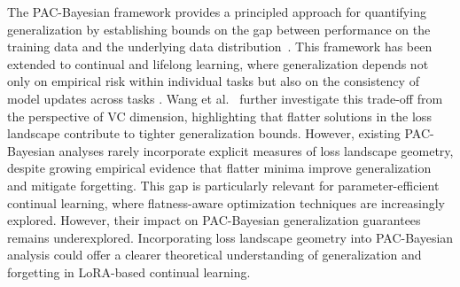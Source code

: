 \documentclass[letterpaper]{article} %
\begin{document}
The PAC-Bayesian framework provides a principled approach for quantifying generalization by establishing bounds on the gap between performance on the training data and the underlying data distribution~\cite{mcallesterPACBayesianStochasticModel2003}. This framework has been extended to continual and lifelong learning, where generalization depends not only on empirical risk within individual tasks but also on the consistency of model updates across tasks \cite{pentinaPACBayesianBoundLifelong2014}. Wang et al.~\cite{wangCoSCLCooperationSmall2022} further investigate this trade-off from the perspective of VC dimension, highlighting that flatter solutions in the loss landscape contribute to tighter generalization bounds. However, existing PAC-Bayesian analyses rarely incorporate explicit measures of loss landscape geometry, despite growing empirical evidence that flatter minima improve generalization and mitigate forgetting.  This gap is particularly relevant for parameter-efficient continual learning, where flatness-aware optimization techniques are increasingly explored. However, their impact on PAC-Bayesian generalization guarantees remains underexplored. Incorporating loss landscape geometry into PAC-Bayesian analysis could offer a clearer theoretical understanding of generalization and forgetting in LoRA-based continual learning.










\end{document}
